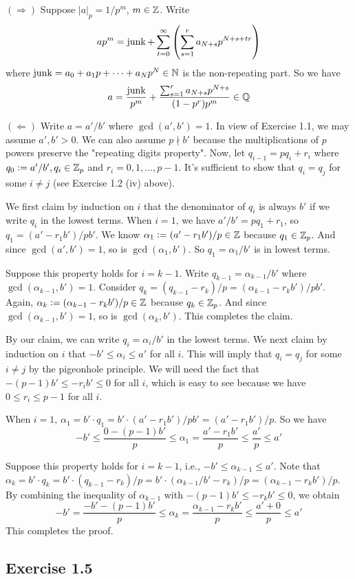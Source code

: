 \documentclass[../Koblitz.tex]{subfiles}
\begin{document}
$(\Rightarrow)$ Suppose $|a|_p=1/p^m$, $m\in\mathbb{Z}$. Write $$ap^m=\operatorname{junk}+\sum_{t=0}^\infty \left(\sum_{s=1}^r a_{N+s}p^{N+s+tr}\right)$$ where $\operatorname{junk}=a_0+a_1p+\cdots+a_Np^N\in\mathbb{N}$ is the non-repeating part. So we have $$a = \frac{\operatorname{junk}}{p^m}+\frac{\sum_{s=1}^r a_{N+s}p^{N+s}}{(1-p^r)p^m}\in\mathbb{Q}$$

$(\Leftarrow)$ Write $a=a'/b'$ where $\gcd(a',b')=1$. In view of Exercise 1.1, we may assume $a',b'>0$. We can also assume $p\nmid b'$ because the multiplications of $p$ powers preserve the "repeating digits property". Now, let $q_{i-1}=pq_i+r_i$ where $q_0:=a'/b',q_i\in\mathbb{Z}_p$ and $r_i=0,1,\ldots,p-1$. It's sufficient to show that $q_i=q_j$ for some $i\neq j$ (see Exercise 1.2 (iv) above).

We first claim by induction on $i$ that the denominator of $q_i$ is always $b'$ if we write $q_i$ in the lowest terms. When $i=1$, we have $a'/b'=pq_1+r_1$, so $q_1=(a'-r_1b')/pb'$. We know $\alpha_1:=(a'-r_1b')/p\in\mathbb{Z}$ because $q_1\in\mathbb{Z}_p$. And since $\gcd(a',b')=1$, so is $\gcd(\alpha_1,b')$. So $q_1=\alpha_1/b'$ is in lowest terms.

Suppose this property holds for $i=k-1$. Write $q_{k-1}=\alpha_{k-1}/b'$ where $\gcd(\alpha_{k-1},b')=1$. Consider $q_k=(q_{k-1}-r_k)/p=(\alpha_{k-1}-r_kb')/pb'$. Again, $\alpha_k:=(\alpha_{k-1}-r_kb')/p\in\mathbb{Z}$ because $q_k\in\mathbb{Z}_p$. And since $\gcd(\alpha_{k-1},b')=1$, so is $\gcd(\alpha_k,b')$. This completes the claim.

By our claim, we can write $q_i=\alpha_i/b'$ in the lowest terms. We next claim by induction on $i$ that $-b'\leq \alpha_i\leq a'$ for all $i$. This will imply that $q_i=q_j$ for some $i\neq j$ by the pigeonhole principle. We will need the fact that $-(p-1)b'\leq-r_ib'\leq 0$ for all $i$, which is easy to see because we have $0\leq r_i\leq p-1$ for all $i$.

When $i=1$, $\alpha_1=b'\cdot q_1=b'\cdot(a'-r_1b')/pb'=(a'-r_1b')/p$. So we have $$-b'\leq\frac{0-(p-1)b'}{p}\leq\alpha_1 = \frac{a'-r_1b'}{p} \leq \frac{a'}{p} \leq a'$$

Suppose this property holds for $i=k-1$, i.e., $-b'\leq\alpha_{k-1}\leq a'$. Note that $\alpha_k=b'\cdot q_k=b'\cdot(q_{k-1}-r_k)/p=b'\cdot(\alpha_{k-1}/b'-r_k)/p=(\alpha_{k-1}-r_kb')/p$. By combining the inequality of $\alpha_{k-1}$ with $-(p-1)b'\leq -r_kb'\leq 0$, we obtain $$-b'=\frac{-b'-(p-1)b'}{p} \leq \alpha_k=\frac{\alpha_{k-1}-r_kb'}{p} \leq \frac{a'+0}{p} \leq a'$$ This completes the proof.

\subsection*{Exercise 1.5}
\end{document}
